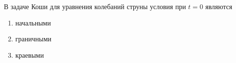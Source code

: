 В задаче Коши для уравнения колебаний струны условия при \(t = 0\) являются

\begin{enumerate}[label=\arabic*)]
    \item начальными
    \item граничными
    \item краевыми
\end{enumerate}

